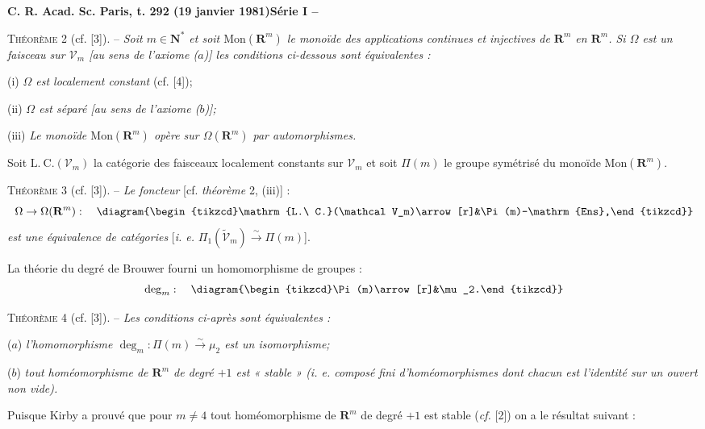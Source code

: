 \textbf{C. R. Acad. Sc. Paris, t. 292 (19 janvier 1981)}\hfill\textbf{Série I -- }

\textsc{Théorème} 2 (cf. [3]). -- \textit{Soit $m\in\mathbf N^*$ et soit $\mathrm{Mon}(\mathbf R^m)$ le monoïde des applications continues et injectives de $\mathbf R^m$ en $\mathbf R^m$. Si $\Omega$ est un faisceau sur $\mathcal V_m$ [au sens de l'axiome ($a$)] les conditions ci-dessous sont équivalentes :}

(i) \textit{$\Omega$ est localement constant} (cf. [4]);

(ii) \textit{$\Omega$ est séparé [au sens de l'axiome ($b$)];}

(iii) \textit{Le monoïde $\mathrm{Mon}(\mathbf R^m)$ opère sur $\Omega(\mathbf R^m)$ par automorphismes.}

Soit $\mathrm{L.\ C.}(\mathcal V_m)$ la catégorie des faisceaux localement constants sur $\mathcal V_m$ et soit $\Pi(m)$ le groupe symétrisé du monoïde $\mathrm{Mon}(\mathbf R^m)$.

\textsc{Théorème} 3 (cf. [3]). -- \textit{Le foncteur} [cf. \textit{théorème} 2, (iii)] :
\[
\Omega\to\Omega(\mathbf R^m):\quad\diagram{\begin{tikzcd}\mathrm{L.\ C.}(\mathcal V_m)\arrow[r]&\Pi(m)-\mathrm{Ens},\end{tikzcd}}
\]
\textit{est une équivalence de catégories} [\textit{i. e.} $\Pi_1(\widetilde{\mathcal V}_m)\xrightarrow{\sim}\Pi(m)$].

La théorie du degré de Brouwer fourni un homomorphisme de groupes :
\[
\deg_m:\quad\diagram{\begin{tikzcd}\Pi(m)\arrow[r]&\mu_2.\end{tikzcd}}
\]

\textsc{Théorème} 4 (cf. [3]). -- \textit{Les conditions ci-après sont équivalentes :}

($a$) \textit{l'homomorphisme $\deg_m:\Pi(m)\xrightarrow{\sim}\mu_2$ est un isomorphisme;}

($b$) \textit{tout homéomorphisme de $\mathbf R^m$ de degré $+1$ est « stable » (i. e. composé fini d'homéomorphismes dont chacun est l'identité sur un ouvert non vide).}

Puisque Kirby a prouvé que pour $m\ne4$ tout homéomorphisme de $\mathbf R^m$ de degré $+1$ est stable (\textit{cf.} [2]) on a le résultat suivant :

